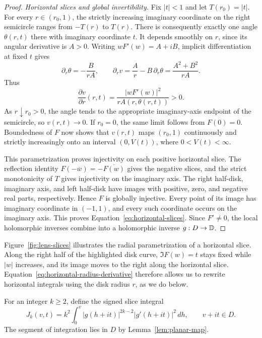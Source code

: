 \begin{proof}
\medskip
\noindent\textit{Horizontal slices and global invertibility.}
Fix \(|t|<1\) and let \(T(r_0)=|t|\).  For every \(r\in(r_0,1)\),
the strictly increasing imaginary coordinate on the right semicircle
ranges from \(-T(r)\) to \(T(r)\).  There is consequently exactly one
angle \(\theta(r,t)\) there with imaginary coordinate \(t\).
It depends smoothly on \(r\), since its angular derivative is \(A>0\).
Writing \(wF'(w)=A+iB\), implicit differentiation at fixed \(t\) gives
\[
 \partial_r\theta=-\frac{B}{rA},
 \qquad
 \partial_r v=\frac{A}{r}-B\,\partial_r\theta
             =\frac{A^2+B^2}{rA}.
\]
Thus
\begin{equation}\label{eq:horizontal-radius-derivative}
 \frac{\partial v}{\partial r}(r,t)
   =\frac{|wF'(w)|^2}{rA(r,\theta(r,t))}>0.
\end{equation}
As \(r\downarrow r_0>0\), the angle tends to the appropriate imaginary-axis
endpoint of the semicircle, so \(v(r,t)\to0\).  If \(r_0=0\), the same
limit follows from \(F(0)=0\).  Boundedness of \(F\) now shows that
\(v(r,t)\) maps \((r_0,1)\) continuously and strictly increasingly onto
an interval \((0,V(t))\), where \(0<V(t)<\infty\).

This parametrization proves injectivity on each positive horizontal
slice.  The reflection identity
\(F(-\overline w)=-\overline{F(w)}\) gives the negative slices, and the
strict monotonicity of \(T\) gives injectivity on the imaginary axis.
The right half-disk, imaginary axis, and left half-disk have images with
positive, zero, and negative real parts, respectively.  Hence \(F\) is
globally injective.  Every point of its image has imaginary coordinate
in \((-1,1)\), and every such coordinate occurs on the imaginary axis.
This proves Equation~\eqref{eq:horizontal-slices}.  Since \(F'\ne0\),
the local holomorphic inverses combine into a holomorphic inverse
\(g:D\to\mathbb D\).
\end{proof}

Figure~\ref{fig:lens-slices} illustrates the radial parametrization of a
horizontal slice.  Along the right half of the highlighted disk curve,
\(\Im F(w)=t\) stays fixed while \(|w|\) increases, and its image moves
to the right along the horizontal slice.
Equation~\eqref{eq:horizontal-radius-derivative} therefore allows us to
rewrite horizontal integrals using the disk radius \(r\), as we do below.


For an integer \(k\ge2\), define the signed slice integral
\begin{equation}\label{eq:slice-primitive}
 J_k(v,t)=k^2\int_0^v
       |g(h+it)|^{2k-2}|g'(h+it)|^2\,dh,
 \qquad v+it\in D.
\end{equation}
The segment of integration lies in \(D\) by Lemma~\ref{lem:planar-map}.

